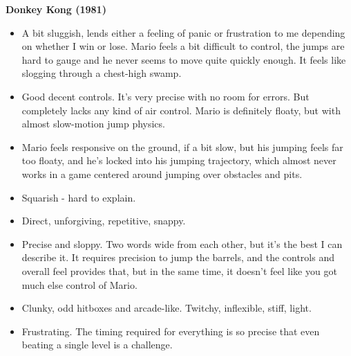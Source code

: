 \textbf{Donkey Kong (1981)}
\vspace{-5mm}
\begin{itemize}[noitemsep,nolistsep]
\item A bit sluggish, lends either a feeling of panic or frustration to me depending on whether I win or lose. Mario feels a bit difficult to control, the jumps are hard to gauge and he never seems to move quite quickly enough. It feels like slogging through a chest-high swamp.
\item Good decent controls. It's very precise with no room for errors. But completely lacks any kind of air control. Mario is definitely floaty, but with almost slow-motion jump physics.
\item Mario feels responsive on the ground, if a bit slow, but his jumping feels far too floaty, and he's locked into his jumping trajectory, which almost never works in a game centered around jumping over obstacles and pits.
\item Squarish - hard to explain.
\item Direct, unforgiving, repetitive, snappy.
\item Precise and sloppy. Two words wide from each other, but it's the best I can describe it. It requires precision to jump the barrels, and the controls and overall feel provides that, but in the same time, it doesn't feel like you got much else control of Mario.
\item Clunky, odd hitboxes and arcade-like. Twitchy, inflexible, stiff, light.
\item Frustrating. The timing required for everything is so precise that even beating a single level is a challenge.
\end{itemize}

